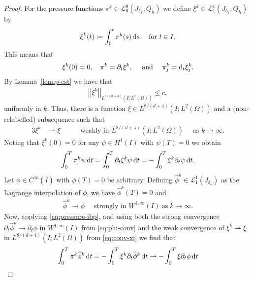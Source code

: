 \documentclass[reqno,a4paper]{amsart}
\def\norm#1{\left|\!\left| #1 \right|\!\right|}
\def\d{{\rm d}}
\def\ds{\,\d s}
\def\dt{\,\d t}
\def\difft{\d_t}
\def\wconv{\rightharpoonup}
\begin{document}
	\begin{proof}
		For the pressure functions $\pi^k \in \mathcal{L}^0_0(J_{\delta_k};Q_h)$ we define $\xi^k \in \mathcal{L}^1_1(J_{\delta_k};Q_h)$ by
		\begin{align}\label{def:phik-2}
			\xi^k(t) \coloneqq \int_0^t \pi^k(s) \ds \quad \text{ for } t \in I. 
		\end{align}
		This means that 
		\begin{align}
			\xi^k(0) = 0, 
			\quad 
			\pi^k = \partial_t \xi^k,
			\quad 
			\text{ and } \quad 
			{\pi^k_j = \difft \xi^k_j}. 
		\end{align}
		By Lemma~\ref{lem:p-est} we have that 
		\begin{align}\label{eq:est-press-4}
			\norm{\xi^k}_{L^{8/(d+4)}(I;L^2(\Omega))} \leq c,
		\end{align}
		uniformly in $k$.
		Thus, there is a function $\xi \in L^{8/(d+4)}(I;L^2(\Omega))$ and a (non-relabelled) subsequence such that 
		\begin{alignat}{3}\label{eq:conv-xi}
			\xi^k 
			&\wconv \xi \quad 
			&&\text{ weakly in } L^{8/(d+4)}(I;L^2(\Omega)) \quad \text{ as } k \to \infty.
		\end{alignat}	
		Noting that $\xi^k(0) = 0$ for any $\psi \in H^1(I)$ with $\psi(T) = 0$ we obtain 
		\begin{align}\label{eq:pressure-ibp}
			\int_0^T \pi^k \psi \dt 
			=
			\int_0^T \partial_t \xi^k \psi \dt 
			= 
			-	\int_0^T  \xi^k \partial_t \psi \dt. 
		\end{align}
		Let $\phi \in C^\infty(\overline I)$ with $\phi(T) = 0$ be arbitrary. 
		Defining $\widehat \phi^k \in \mathcal{L}^1_1(J_{\delta_k})$ as the Lagrange interpolation of $\phi$, we have $\widehat{\phi}^{k}(T)=0$ and 
		\begin{align}\label{eq:phi-conv}
			\widehat \phi^k \to \phi \quad \text{ strongly in } W^{1,\infty}(I)\;\text{as}\;k\to\infty.
		\end{align} 
		Now, applying \eqref{eq:pressure-ibp}, and using both the strong convergence $\partial_t \widehat \phi^k \to \partial_t \phi$ in $W^{1,\infty}(I)$ from \eqref{eq:phi-conv} and the weak convergence of $\xi^k \wconv \xi$ in $L^{8/(d+4)}(I;L^{2}(\Omega))$ from \eqref{eq:conv-xi} we find that 
		\begin{align}\label{eq:pressure-1}
			\int_0^T \pi^k \widehat \phi^k \dt 
			= 	
			- \int_0^T \xi^k  \partial_t \widehat \phi^k  \dt
			\wconv 
			- \int_0^T \xi \partial_t \phi  \dt
		\end{align}

\end{proof}
\end{document}
